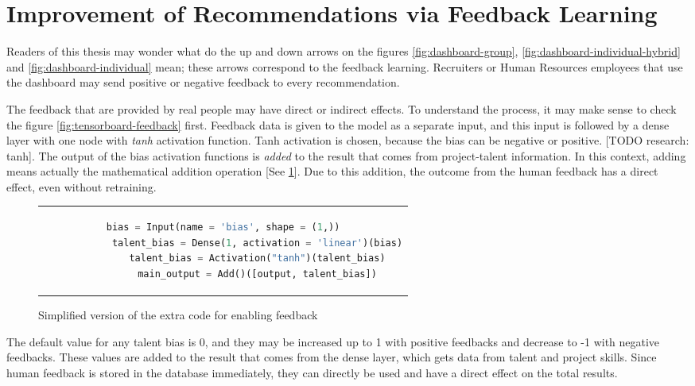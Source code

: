 \section{Improvement of Recommendations via Feedback Learning}\label{section:feedback-learning}

Readers of this thesis may wonder what do the up and down arrows on the figures \ref{fig:dashboard-group}, \ref{fig:dashboard-individual-hybrid} and \ref{fig:dashboard-individual} mean; these arrows correspond to the feedback learning. Recruiters or Human Resources employees that use the dashboard may send positive or negative feedback to every recommendation. 

The feedback that are provided by real people may have direct or indirect effects. To understand the process, it may make sense to check the figure \ref{fig:tensorboard-feedback} first. Feedback data is given to the model as a separate input, and this input is followed by a dense layer with one node with \textit{tanh} activation function. Tanh activation is chosen, because the bias can be negative or positive. [TODO research: tanh]. The output of the bias activation functions is \textit{added} to the result that comes from project-talent information. In this context, adding means actually the mathematical addition operation [See \ref{fig:feedback-model-code}]. Due to this addition, the outcome from the human feedback has a direct effect, even without retraining. 


\begin{figure}[!ht]
	\centering
	\begin{tabular}{c}
		\begin{lstlisting}[language=Python]
			bias = Input(name = 'bias', shape = (1,))
			talent_bias = Dense(1, activation = 'linear')(bias)
			talent_bias = Activation("tanh")(talent_bias)
			main_output = Add()([output, talent_bias])
		\end{lstlisting}
	\end{tabular}
	\caption[Model Bias Code]{Simplified version of the extra code for enabling feedback}\label{fig:feedback-model-code}
\end{figure}

The default value for any talent bias is 0, and they may be increased up to 1 with positive feedbacks and decrease to -1 with negative feedbacks. These values are added to the result that comes from the dense layer, which gets data from talent and project skills. Since human feedback is stored in the database immediately, they can directly be used and have a direct effect on the total results.


